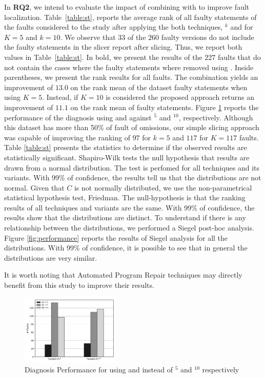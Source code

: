 \documentclass{article}
\begin{document}
In \textbf{RQ2}, we intend to evaluate the impact of combining \ds{} with \sfl{}
to improve fault localization. Table~\ref{table:st}, reports the average rank of all faulty
statements of the \dfj{} faults considered to the study after applying the both
techniques, \sfl{}$^{k}$ and  for $K=5$ and $k=10$. We observe that
$33$ of the $260$
faulty versions do not include the faulty statements in the slicer report after slicing.
Thus, we report both values in Table~\ref{table:st}. In bold, we present the
results of the $227$ faults that do not contain the cases where the faulty
statements where removed using . Inside parentheses, we present the
rank results for all faults. The  combination yields an improvement
of $13.0$ on the rank mean of the dataset faulty statements when using $K=5$.
Instead, if $K=10$ is considered the proposed approach returns an improvement of
$11.1$ on the rank mean of faulty statements.
 Figure \ref{fig:diagnosis} reports the performance of the diagnosis
using  and  against \sfl{}$^{5}$ and \sfl{}$^{10}$,
respectively. Although this dataset has more than 50\% of fault of omissions,
our simple slicing approach was capable of improving the ranking of $97$ for
$k=5$ and $117$ for $K=117$ faults. Table \ref{table:st} presents the statistics
to determine if the observed results are statistically significant. Shapiro-Wilk
tests the null hypothesis that results are drawn from a normal distribution. The
test is perfomed for all techniques and its variants. With 99\% of confidence,
the results tell us that the distributions are not normal. Given that $C$ is not
normally distributed, we use the non-parametrical statistical hypothesis test,
Friedman. The null-hypothesis is that the ranking results of all techniques and
variants are the same. With 99\% of confidence, the results show that the
distributions are distinct. To understand if there is any relationship
between the distributions,
we performed a Siegel post-hoc analysis. Figure
\ref{fig:performance} reports the results of Siegel analysis for all the
distributions. With 99\% of confidence, it is possible to see that in general
the distributions are very similar. 

It is worth noting that Automated
Program Repair techniques may directly benefit from this study to improve their
results.


\begin{figure}[h]
		\centering
		\includegraphics[width=0.42\textwidth]{figures/performance.pdf}
		\caption{Diagnosis Performance for using  and  instead of \sfl{}$^{5}$ and \sfl{}$^{10}$ respectively}
		\label{fig:diagnosis}
\end{figure}
\end{document}
